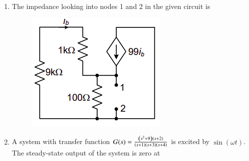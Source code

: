 \documentclass[journal,12pt,onecolumn]{IEEEtran}
\theoremstyle{remark}
\begin{document}
\begin{enumerate}[start=1, label=Q.\arabic*]
\hfill{}
\begin{enumerate}

\end{enumerate}

\item The impedance looking into nodes 1 and 2 in the given circuit is
\begin{figure}[H]
    \centering
    \includegraphics[width=0.4\columnwidth]{q5}
    \caption{}
\end{figure}

\begin{enumerate}
\end{enumerate}
\hfill{}

\item A system with transfer function $G(s)=\frac{\left(s^{2}+9\right)\left(s+2\right)}{\left(s+1\right)\left(s+3\right)\left(s+4\right)}$ is excited by $\sin(\omega t)$. The steady-state output of the system is zero at

\begin{enumerate}
\end{enumerate}
\hfill{}


\end{enumerate}
\end{document}
